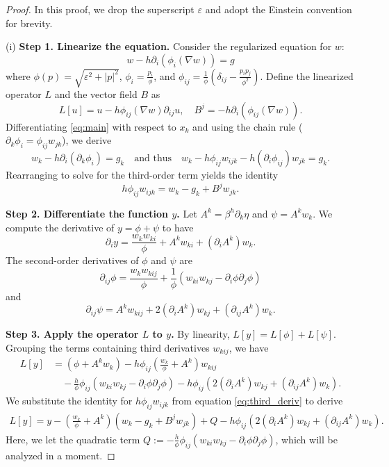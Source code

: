 \documentclass[11pt]{article}
\numberwithin{equation}{section}
\begin{document}
\begin{proof}
In this proof, we drop the superscript $\varepsilon$ and adopt the Einstein convention for brevity.

\medskip

(i) \textbf{Step 1. Linearize the equation.} Consider the regularized equation for $w$:
\begin{equation}\label{eq:main}
w - h \partial_i (\phi_i(\nabla w)) = g 
\end{equation}
where $\phi(p) = \sqrt{\varepsilon^2 + |p|^2}$, $\phi_i = \frac{p_i}{\phi}$, and $\phi_{ij} = \frac{1}{\phi} \left( \delta_{ij} - \frac{p_i p_j}{\phi^2} \right)$. Define the linearized operator $L$ and the vector field $B$ as
\[
L[u] = u - h \phi_{ij}(\nabla w) \partial_{ij} u, \quad B^j = -h \partial_i (\phi_{ij}(\nabla w)).
\]
Differentiating \eqref{eq:main} with respect to $x_k$ and using the chain rule ($\partial_k \phi_i = \phi_{ij} w_{jk}$), we derive
\[
w_k - h \partial_i (\partial_k \phi_i) = g_k \quad\text{and thus}\quad w_k - h \phi_{ij} w_{ijk} - h (\partial_i \phi_{ij}) w_{jk} = g_k.
\]
Rearranging to solve for the third-order term yields the identity
\begin{equation}\label{eq:third_deriv}
h \phi_{ij} w_{ijk} = w_k - g_k + B^j w_{jk}. 
\end{equation}

\medskip

\textbf{Step 2. Differentiate the function $y$.} Let $A^k = \beta^h \partial_k \eta$ and $\psi = A^k w_k$. We compute the derivative of $y = \phi + \psi$ to have
\begin{equation}\label{eq:first_y}
\partial_i y = \frac{w_k w_{ki}}{\phi} + A^k w_{ki} + (\partial_i A^k) w_k.
\end{equation}
The second-order derivatives of $\phi$ and $\psi$ are
\[
\partial_{ij} \phi = \frac{w_k w_{kij}}{\phi} + \frac{1}{\phi} (w_{ki} w_{kj} - \partial_i \phi \partial_j \phi)
\]
and
\[
\partial_{ij} \psi = A^k w_{kij} + 2(\partial_i A^k) w_{kj} + (\partial_{ij} A^k) w_k.
\]

\medskip

\textbf{Step 3. Apply the operator $L$ to $y$.} By linearity, $L[y] = L[\phi] + L[\psi]$. Grouping the terms containing third derivatives $w_{kij}$, we have
\begin{align*}
L[y] &= (\phi + A^k w_k) - h \phi_{ij} \left( \frac{w_k}{\phi} + A^k \right) w_{kij} \\
&\quad - \frac{h}{\phi} \phi_{ij} (w_{ki} w_{kj} - \partial_i \phi \partial_j \phi) - h \phi_{ij} \left( 2 (\partial_i A^k) w_{kj} + (\partial_{ij} A^k) w_k \right).
\end{align*}
We substitute the identity for $h \phi_{ij} w_{ijk}$ from equation \eqref{eq:third_deriv} to derive
\begin{align*}
L[y] = y - \left( \frac{w_k}{\phi} + A^k \right) (w_k - g_k + B^j w_{jk})  + Q - h \phi_{ij} \left( 2 (\partial_i A^k) w_{kj} + (\partial_{ij} A^k) w_k \right).
\end{align*}
Here, we let the quadratic term $Q := - \frac{h}{\phi} \phi_{ij} (w_{ki} w_{kj} - \partial_i \phi \partial_j \phi)$, which will be analyzed in a moment.


\end{proof}
\end{document}
